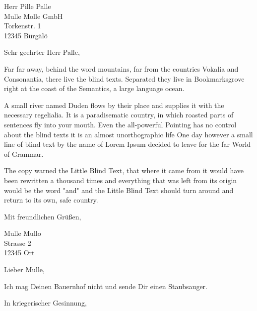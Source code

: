 \documentclass[
    absender,
    paper=a4,
    version=last,
    fontsize=11pt,
    DIV=13,
    BCOR=0mm]{scrlttr2}
\begin{document}


\begin{letter}{
    Herr Pille Palle\\
    Mulle Molle GmbH\\
    Torkenstr. 1\\
    12345 Bürgälö
}
\opening{Sehr geehrter Herr Palle,}

Far far away, behind the word mountains, far from the countries Vokalia and Consonantia, there live the blind texts. Separated they live in Bookmarksgrove right at the coast of the Semantics, a large language ocean.

A small river named Duden flows by their place and supplies it with the necessary regelialia. It is a paradisematic country, in which roasted parts of sentences fly into your mouth. Even the all-powerful Pointing has no control about the blind texts it is an almost unorthographic life One day however a small line of blind text by the name of Lorem Ipsum decided to leave for the far World of Grammar.

The copy warned the Little Blind Text, that where it came from it would have been rewritten a thousand times and everything that was left from its origin would be the word "and" and the Little Blind Text should turn around and return to its own, safe country.

\closing{Mit freundlichen Grüßen,}
\end{letter}


\begin{letter}{
    Mulle Mullo\\
    Strasse 2\\
    12345 Ort}
\opening{Lieber Mulle,}
Ich mag Deinen Bauernhof nicht und sende Dir einen Staubsauger.
\closing{In kriegerischer Gesinnung,}
\end{letter}
\end{document}
